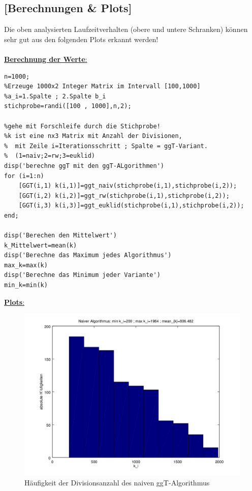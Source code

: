 \documentclass{llncs}
\begin{document}
\subsection*{[Berechnungen \& Plots]}
Die oben analysierten Laufzeitverhalten (obere und untere Schranken) können sehr gut aus den folgenden Plots erkannt werden!\\\\
\underline{\textbf{Berechnung der Werte}:}
\begin{lstlisting} 
n=1000; 
%Erzeuge 1000x2 Integer Matrix im Intervall [100,1000] 
%a_i=1.Spalte ; 2.Spalte b_i
stichprobe=randi([100 , 1000],n,2);

%gehe mit Forschleife durch die Stichprobe!
%k ist eine nx3 Matrix mit Anzahl der Divisionen,
%  mit Zeile i=Iterationsschritt ; Spalte = ggT-Variant. 
%  (1=naiv;2=rw;3=euklid)
disp('berechne ggT mit den ggT-ALgorithmen')
for (i=1:n)
	[GGT(i,1) k(i,1)]=ggt_naiv(stichprobe(i,1),stichprobe(i,2));
	[GGT(i,2) k(i,2)]=ggt_rw(stichprobe(i,1),stichprobe(i,2));
	[GGT(i,3) k(i,3)]=ggt_euklid(stichprobe(i,1),stichprobe(i,2));
end;

disp('Berechen den Mittelwert')
k_Mittelwert=mean(k)
disp('Berechne das Maximum jedes Algorithmus')
max_k=max(k)
disp('Berechne das Minimum jeder Variante')
min_k=min(k)
\end{lstlisting}
\underline{\textbf{Plots}:}
\begin{figure}[h]
\centering
 	\includegraphics[width=1.0\textwidth]{Code/naiverAlgo_Histogramm.png}
	\caption{Häufigkeit der Divisionsanzahl des naiven ggT-Algorithmus}
\end{figure}
\end{document}

